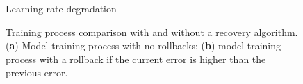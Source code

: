 \begin{figure}[ht]
  \centering
  
  \caption{Learning rate degradation}
  \label{fig:l_rate_progress}
\end{figure}
\vspace{-6pt}
\begin{figure}[H]
  \begin{subfigure}[b]{0.45\textwidth}
    
    \caption{\centering}
    \label{subfig:no-rollback}
  \end{subfigure}
  \begin{subfigure}[b]{0.45\textwidth}
    
    \caption{\centering}
    \label{subfig:rollback}
  \end{subfigure}
  \caption{Training process comparison with and without a recovery algorithm. (\textbf{a}) Model training process with no rollbacks; (\textbf{b}) model training process with a rollback if the current error is higher than the previous error.}
  \label{fig:rollback}
\end{figure}

